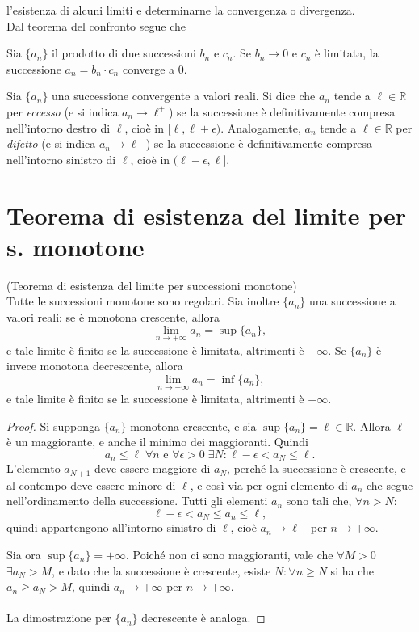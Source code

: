 \documentclass[a4paper,12pt, oneside]{book}
\begin{document}
l'esistenza di alcuni limiti e determinarne la convergenza o divergenza.\\ Dal
teorema del confronto segue che
\begin{osservazione} Sia $\{a_n\}$ il prodotto di due successioni $b_n$ e
  $c_n$. Se $b_n\to 0$ e $c_n$ è limitata, la successione $a_n=b_n\cdot c_n$
  converge a 0.
\end{osservazione} %
\begin{definizione} Sia $\{a_n\}$ una successione
  convergente a valori reali. Si dice che $a_n$ tende a $\ell\in\mathbb{R}$ per
  \emph{eccesso} (e si indica $a_n\to\ell^+$) se la successione è definitivamente
  compresa nell'intorno destro di $\ell$, cioè in $[\ell,\ell+\epsilon)$.
  Analogamente, $a_n$ tende a $\ell\in\mathbb{R}$ per \emph{difetto} (e si indica
  $a_n\to\ell^-$) se la successione è definitivamente compresa nell'intorno
  sinistro di $\ell$, cioè in $(\ell-\epsilon,\ell]$.
\end{definizione}
\section{Teorema di esistenza del limite per s. monotone}
\begin{teorema}(Teorema di esistenza del limite per successioni monotone)\\
  Tutte le successioni monotone sono regolari. Sia inoltre $\{a_n\}$ una
  successione a valori reali: se è monotona crescente, allora
  $$\lim_{n\to +\infty} a_n=\sup\{a_n\},$$
  e tale limite è finito se la successione è limitata, altrimenti è $+\infty$.
  Se $\{a_n\}$ è invece monotona decrescente, allora
  $$\lim_{n\to +\infty} a_n=\inf\{a_n\},$$
  e tale limite è finito se la successione è limitata, altrimenti è $-\infty$.
\end{teorema}
\begin{proof} Si supponga $\{a_n\}$ monotona crescente, e sia
  $\sup\{a_n\}=\ell\in\mathbb{R}$. Allora $\ell$ è un maggiorante, e anche il
  minimo dei maggioranti. Quindi
  $$a_n\leq\ell\;\forall n\text{ e }\forall\epsilon>0\;\exists N\colon\ell-\epsilon<a_N\leq\ell.$$
  L'elemento $a_{N+1}$ deve essere maggiore di $a_N$, perché la successione è
  crescente, e al contempo deve essere minore di $\ell$, e così via per ogni
  elemento di $a_n$ che segue nell'ordinamento della successione. Tutti gli
  elementi $a_n$ sono tali che, $\forall n>N$:
  $$\ell-\epsilon<a_N\leq a_n\leq\ell,$$
  quindi appartengono all'intorno sinistro di $\ell$, cioè $a_n\to\ell^-$ per
  $n\to +\infty$.

  Sia ora $\sup\{a_n\}=+\infty$. Poiché non ci sono maggioranti, vale che
  $\forall M>0$ $\exists a_N>M$, e dato che la successione è crescente, esiste
  $N\colon\forall n\geq N$ si ha che $a_n\geq a_N>M$, quindi $a_n\to +\infty$ per
  $n\to +\infty$.\\\\ La dimostrazione per $\{a_n\}$ decrescente è analoga.
\end{proof}
\end{document}
